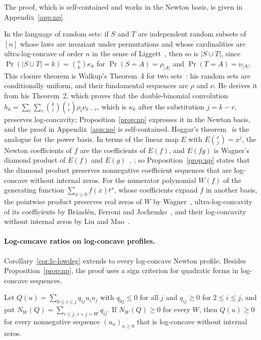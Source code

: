 The proof, which is self-contained and works in the Newton basis, is given in Appendix~\ref{app:np}.

In the language of random sets: if $S$ and $T$ are independent random subsets of $[n]$ whose laws are invariant under permutations and whose cardinalities are ultra-log-concave of order $n$ in the sense of Liggett~\cite{liggett}, then so is $|S\cup T|$, since $\Pr(|S\cup T|=k)=\binom nk\kappa_k$ for $\Pr(S=A)=\rho_{|A|}$ and $\Pr(T=A)=\nu_{|A|}$. This closure theorem is Walkup's Theorem~4 for two sets~\cite{walkup}: his random sets are conditionally uniform, and their fundamental sequences are $\rho$ and $\nu$. He derives it from his Theorem~2, which proves that the double-binomial convolution $h_k=\sum_i\sum_r\binom ki\binom ir\rho_i\nu_{k-r}$, which is $\kappa_k$ after the substitution $j=k-r$, preserves log-concavity; Proposition~\ref{prop:np} expresses it in the Newton basis, and the proof in Appendix~\ref{app:np} is self-contained. Hoggar's theorem~\cite{hoggar} is the analogue for the power basis. In terms of the linear map $E$ with $E\binom xj=x^j$, the Newton coefficients of $f$ are the coefficients of $E(f)$, and $E(fg)$ is Wagner's diamond product of $E(f)$ and $E(g)$~\cite[(4.3)]{bfj}, \cite[Theorem~2.3]{wagner}; so Proposition~\ref{prop:np} states that the diamond product preserves nonnegative coefficient sequences that are log-concave without internal zeros. For the numerator polynomial $W(f)$ of the generating function $\sum_{x\geq0}f(x)t^x$, whose coefficients expand $f$ in another basis, the pointwise product preserves real zeros of $W$ by Wagner~\cite{wagner}, ultra-log-concavity of its coefficients by Br\"and\'en, Ferroni and Jochemko~\cite{bfj}, and their log-concavity without internal zeros by Liu and Mao~\cite{liumao}.

\paragraph{Log-concave ratios on log-concave profiles.}
Corollary~\ref{cor:lc-lowdeg} extends to every log-concave Newton profile. Besides Proposition~\ref{prop:np}, the proof uses a sign criterion for quadratic forms in log-concave sequences.

\begin{lemma}\label{lem:abel-weights}
Let $Q(u)=\sum_{0\leq i\leq j}q_{ij}u_iu_j$ with $q_{0j}\leq0$ for all $j$ and $q_{ij}\geq0$ for $2\leq i\leq j$, and put $N_W(Q)=\sum_{i\leq j,\,i+j=W}q_{ij}$. If $N_W(Q)\geq0$ for every $W$, then $Q(u)\geq0$ for every nonnegative sequence $(u_n)_{n\geq0}$ that is log-concave without internal zeros.
\end{lemma}

